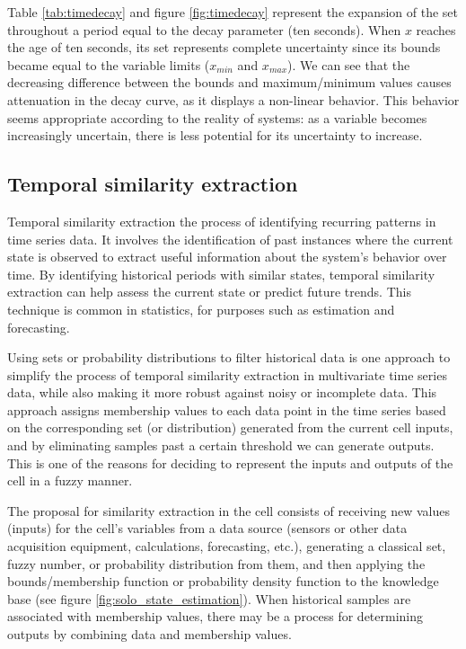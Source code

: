 
Table \ref{tab:timedecay} and figure \ref{fig:timedecay} represent the expansion of the set throughout a period equal to the decay parameter (ten seconds). When $x$ reaches the age of ten seconds, its set represents complete uncertainty since its bounds became equal to the variable limits ($x_{min}$ and $x_{max}$). We can see that the decreasing difference between the bounds and maximum/minimum values causes attenuation in the decay curve, as it displays a non-linear behavior. This behavior seems appropriate according to the reality of systems: as a variable becomes increasingly uncertain, there is less potential for its uncertainty to increase.


\subsection{Temporal similarity extraction} \label{subsec:tempsim}

Temporal similarity extraction the process of identifying recurring patterns in time series data. It involves the identification of past instances where the current state is observed to extract useful information about the system's behavior over time. By identifying historical periods with similar states, temporal similarity extraction can help assess the current state or predict future trends. This technique is common in statistics, for purposes such as estimation and forecasting.

Using sets or probability distributions to filter historical data is one approach to simplify the process of temporal similarity extraction in multivariate time series data, while also making it more robust against noisy or incomplete data. This approach assigns membership values to each data point in the time series based on the corresponding set (or distribution) generated from the current cell inputs, and by eliminating samples past a certain threshold we can generate outputs. This is one of the reasons for deciding to represent the inputs and outputs of the cell in a fuzzy manner. 

The proposal for similarity extraction in the cell consists of receiving new values (inputs) for the cell's variables from a data source (sensors or other data acquisition equipment, calculations, forecasting, etc.), generating a classical set, fuzzy number, or probability distribution from them, and then applying the bounds/membership function or probability density function to the knowledge base (see figure \ref{fig:solo_state_estimation}). When historical samples are associated with membership values, there may be a process for determining outputs by combining data and membership values.

